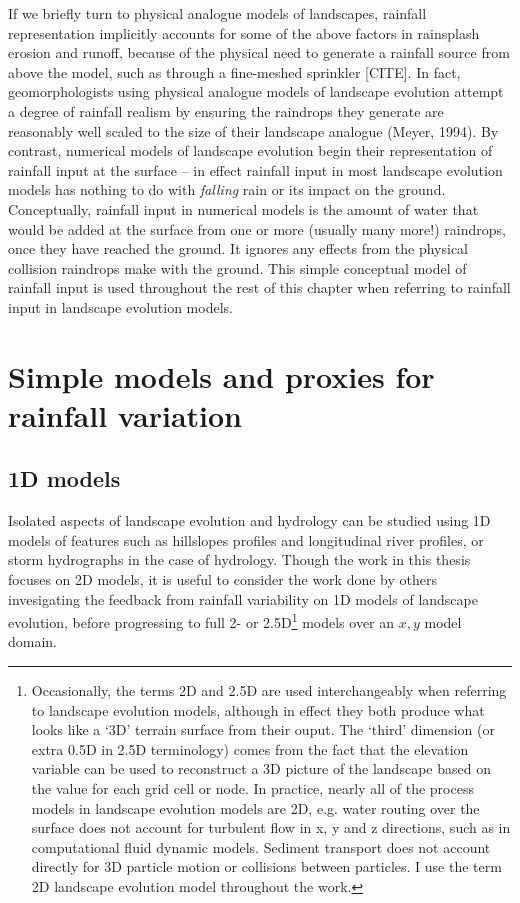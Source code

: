 If we briefly turn to physical analogue models of landscapes, rainfall representation implicitly accounts for some of the above factors in rainsplash erosion and runoff, because of the physical need to generate a rainfall source from above the model, such as through a fine-meshed sprinkler [CITE]. In fact, geomorphologists using physical analogue models of landscape evolution attempt a degree of rainfall realism by ensuring the raindrops they generate are reasonably well scaled to the size of their landscape analogue (Meyer, 1994). By contrast, numerical models of landscape evolution begin their representation of rainfall input at the surface -- in effect rainfall input in most landscape evolution models has nothing to do with \textit{falling} rain or its impact on the ground. Conceptually, rainfall input in numerical models is the amount of water that would be added at the surface from one or more (usually many more!) raindrops, once they have reached the ground. It ignores any effects from the physical collision raindrops make with the ground. This simple conceptual model of rainfall input is used throughout the rest of this chapter when referring to rainfall input in landscape evolution models.

\section{Simple models and proxies for rainfall variation}

\subsection{1D models}
Isolated aspects of landscape evolution and hydrology can be studied using 1D models of features such as hillslopes profiles and longitudinal river profiles, or storm hydrographs in the case of hydrology. Though the work in this thesis focuses on 2D models, it is useful to consider the work done by others invesigating the feedback from rainfall variability on 1D models of landscape evolution, before progressing to full 2- or 2.5D\footnote{Occasionally, the terms 2D and 2.5D are used interchangeably when referring to landscape evolution models, although in effect they both produce what looks like a `3D' terrain surface from their ouput. The `third' dimension (or extra 0.5D in 2.5D terminology) comes from the fact that the elevation variable can be used to reconstruct a 3D picture of the landscape based on the value for each grid cell or node. In practice, nearly all of the process models in landscape evolution models are 2D, e.g. water routing over the surface does not account for turbulent flow in x, y and z directions, such as in computational fluid dynamic models. Sediment transport does not account directly for 3D particle motion or collisions between particles. I use the term 2D landscape evolution model throughout the work.} models over an \(x,y\) model domain. 

